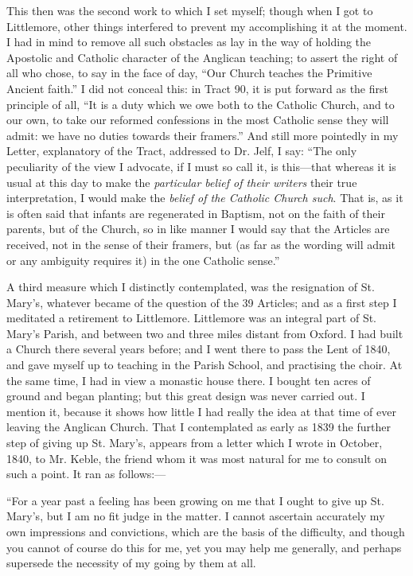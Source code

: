 This then was the second work to which I set myself; though when I
got to Littlemore, other things interfered to prevent my accomplishing it at the moment. I had in
mind to remove all such
obstacles as lay in the way of holding the Apostolic and
Catholic character of the Anglican teaching; to assert the right of all
who chose, to say in the face of day, ``Our Church teaches
the Primitive Ancient faith.'' I did not conceal this: in Tract 90,
it is put forward as the first principle of all, ``It is a duty
which we owe both to the Catholic Church, and to our own, to take our
reformed confessions in the most Catholic sense they will admit: we have
no duties towards their framers.'' And still more pointedly in my Letter, explanatory of the Tract, addressed to Dr. Jelf, I say:
``The only peculiarity of the view I advocate, if I must so call it,
is this—that whereas it is usual at this day to make the \emph{particular
belief of their writers} their true interpretation, I would make the \emph{belief
of the Catholic Church such}. That is, as it is often said that
infants are regenerated in Baptism, not on the faith of their parents,
but of the Church, so in like manner I would say that the Articles are
received, not in the sense of their framers, but (as far as the wording
will admit or any ambiguity requires it) in the one Catholic
sense.''

A third measure which I distinctly contemplated, was the resignation
of St. Mary's, whatever became of the question of the 39
Articles; and as a first step I meditated a retirement to Littlemore. Littlemore was an integral part of St. Mary's Parish, and between
two and three miles distant from Oxford. I had built a Church there
several years before; and I went there to pass the Lent of 1840, and
gave myself up to teaching in the Parish School, and practising
the choir. At the same time, I had in view a monastic house
there. I bought ten acres of ground and began planting; but this great
design was never carried out. I mention it, because it shows how little
I had really the idea at that time of ever leaving the Anglican
Church. That I contemplated as early as 1839 the further step of giving up
St. Mary's, appears from a letter which I wrote
in October, 1840, to Mr. Keble, the friend whom it was most natural for
me to consult on such a point. It ran as follows:—

``For a year past a feeling has been growing on me that I ought
to give up St. Mary's, but I am no fit judge in the matter. I cannot
ascertain accurately my own impressions and convictions, which are the
basis of the difficulty, and though you cannot of course do this for me,
yet you may help me generally, and perhaps supersede the necessity of my
going by them at all.

